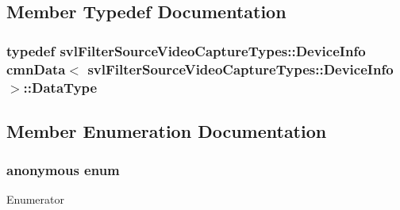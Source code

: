 \subsection{Member Typedef Documentation}
\hypertarget{classcmn_data_3_01svl_filter_source_video_capture_types_1_1_device_info_01_4_afce8b1b6d893ddc5d505f2f1574ac4af}{
\subsubsection[{Data\-Type}]{\setlength{\rightskip}{0pt plus 5cm}typedef {\bf svl\-Filter\-Source\-Video\-Capture\-Types\-::\-Device\-Info} {\bf cmn\-Data}$<$ {\bf svl\-Filter\-Source\-Video\-Capture\-Types\-::\-Device\-Info} $>$\-::{\bf Data\-Type}}}\label{classcmn_data_3_01svl_filter_source_video_capture_types_1_1_device_info_01_4_afce8b1b6d893ddc5d505f2f1574ac4af}


\subsection{Member Enumeration Documentation}
\hypertarget{classcmn_data_3_01svl_filter_source_video_capture_types_1_1_device_info_01_4_a759e1517e69816631066edff4edfbddf}{\subsubsection[{anonymous enum}]{\setlength{\rightskip}{0pt plus 5cm}anonymous enum}}\label{classcmn_data_3_01svl_filter_source_video_capture_types_1_1_device_info_01_4_a759e1517e69816631066edff4edfbddf}
\begin{Desc}
\item[Enumerator]\par
\begin{description}
\item[{\em 
\hypertarget{classcmn_data_3_01svl_filter_source_video_capture_types_1_1_device_info_01_4_a759e1517e69816631066edff4edfbddfabab1017c2f050ed948aceb6bb647ac49}{I\-S\-\_\-\-S\-P\-E\-C\-I\-A\-L\-I\-Z\-E\-D}\label{classcmn_data_3_01svl_filter_source_video_capture_types_1_1_device_info_01_4_a759e1517e69816631066edff4edfbddfabab1017c2f050ed948aceb6bb647ac49}
}]\end{description}
\end{Desc}


